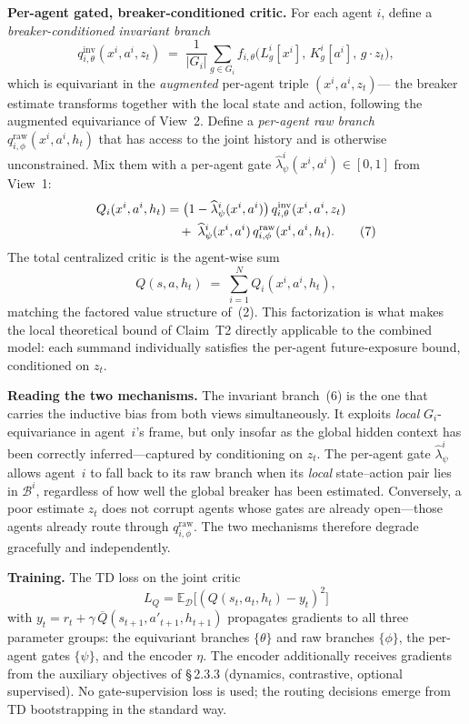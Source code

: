 \documentclass[11pt]{article}
\begin{document}
\textbf{Per-agent gated, breaker-conditioned critic.} For each agent $i$, define a
\textit{breaker-conditioned invariant branch}
\begin{equation}
q^{\text{inv}}_{i,\theta}(x^i, a^i, z_t)
\;=\; \frac{1}{|G_i|}\sum_{g \in G_i} f_{i,\theta}\!\bigl(L^i_g[x^i],\,K^i_g[a^i],\,g \cdot z_t\bigr), \tag{6}
\end{equation}
which is equivariant in the \textit{augmented} per-agent triple $(x^i, a^i, z_t)$---
the breaker estimate transforms together with the local state and action,
following the augmented equivariance of View~2. Define a \textit{per-agent raw
branch} $q^{\text{raw}}_{i,\phi}(x^i, a^i, h_t)$ that has access to the joint
history and is otherwise unconstrained. Mix them with a per-agent gate
$\widehat{\lambda}^i_\psi(x^i, a^i) \in [0,1]$ from View~1:
\begin{align}
Q_i(x^i, a^i, h_t)
&= \bigl(1 - \widehat{\lambda}^i_\psi(x^i, a^i)\bigr)\,q^{\text{inv}}_{i,\theta}(x^i, a^i, z_t) \notag \\
&\quad +\; \widehat{\lambda}^i_\psi(x^i, a^i)\,q^{\text{raw}}_{i,\phi}(x^i, a^i, h_t). \tag{7}
\end{align}
The total centralized critic is the agent-wise sum
\begin{equation}
Q(s, a, h_t) \;=\; \sum_{i=1}^N Q_i(x^i, a^i, h_t), \tag{8}
\end{equation}
matching the factored value structure of~(2). This factorization is what
makes the local theoretical bound of Claim~T2 directly applicable to the
combined model: each summand individually satisfies the per-agent
future-exposure bound, conditioned on $z_t$.

\textbf{Reading the two mechanisms.} The invariant branch~(6) is the one that
carries the inductive bias from both views simultaneously. It exploits \textit{local}
$G_i$-equivariance in agent~$i$'s frame, but only insofar as the global hidden
context has been correctly inferred---captured by conditioning on $z_t$. The
per-agent gate $\widehat{\lambda}^i_\psi$ allows agent~$i$ to fall back to its
raw branch when its \textit{local} state--action pair lies in $\mathcal{B}^i$,
regardless of how well the global breaker has been estimated. Conversely, a
poor estimate $z_t$ does not corrupt agents whose gates are already
open---those agents already route through $q^{\text{raw}}_{i,\phi}$. The two
mechanisms therefore degrade gracefully and independently.

\textbf{Training.} The TD loss on the joint critic
\[
  L_Q = \mathbb{E}_\mathcal{D}\bigl[(Q(s_t, a_t, h_t) - y_t)^2\bigr]
\]
with $y_t = r_t + \gamma\,\overline{Q}(s_{t+1}, a'_{t+1}, h_{t+1})$
propagates gradients to all three parameter groups: the equivariant branches
$\{\theta\}$ and raw branches $\{\phi\}$, the per-agent gates $\{\psi\}$, and
the encoder $\eta$. The encoder additionally receives gradients from the
auxiliary objectives of \S\,2.3.3 (dynamics, contrastive, optional supervised).
No gate-supervision loss is used; the routing decisions emerge from TD
bootstrapping in the standard way.
\end{document}

